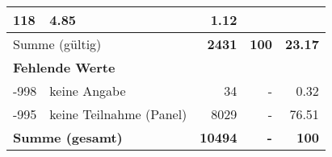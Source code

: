 \begin{longtable}{lXrrr}
       \num{118} &
       \num[round-mode=places,round-precision=2]{4.85} &
         \num[round-mode=places,round-precision=2]{1.12} \\
     \midrule
     \multicolumn{2}{l}{Summe (gültig)} &
       \textbf{\num{2431}} &
     \textbf{\num{100}} &
       \textbf{\num[round-mode=places,round-precision=2]{23.17}} \\
     \multicolumn{5}{l}{\textbf{Fehlende Werte}}\\
       -998 &
       keine Angabe &
         \num{34} &
        - &
         \num[round-mode=places,round-precision=2]{0.32} \\
       -995 &
       keine Teilnahme (Panel) &
         \num{8029} &
        - &
         \num[round-mode=places,round-precision=2]{76.51} \\
     \midrule
     \multicolumn{2}{l}{\textbf{Summe (gesamt)}} &
          \textbf{\num{10494}} &
        \textbf{-} &
        \textbf{\num{100}} \\
     \bottomrule
     \end{longtable}
     

